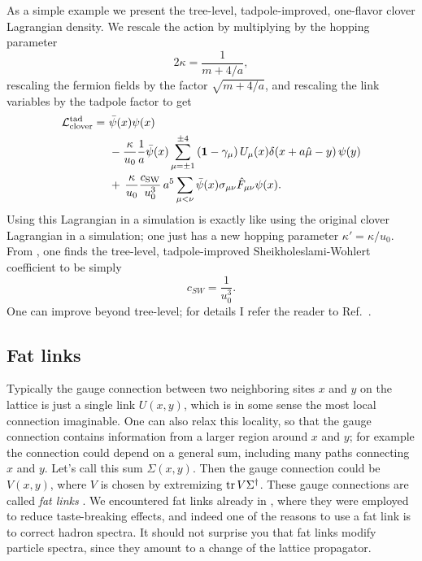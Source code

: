 As a simple example we present the tree-level, tadpole-improved, one-flavor
clover Lagrangian density. We rescale the action by multiplying by 
the hopping parameter
\begin{equation}
  2\kappa=\frac{1}{m+4/a},
\end{equation}
rescaling the fermion fields by the factor $\sqrt{m+4/a}$, and
rescaling the link variables by the tadpole factor to get
\begin{equation}\begin{aligned}
  \mathcal{L}_\text{clover}^\text{tad}=~&\bar{\psi}(x)\psi(x)\\
    &-\frac{\kappa}{u_0}\frac{1}{a}\bar{\psi}(x)
    \sum_{\mu=\pm1}^{\pm4}\left({\mathbf 1}-\gamma_\mu\right)U_\mu(x)
           \delta(x+a\hat{\mu}-y)\,\psi(y)\\
    &+\,\frac{\kappa}{u_0}\frac{c_\text{SW}}{u_0^3}
               \,a^5\sum_{\mu<\nu}\bar{\psi}(x)
                  \sigma_{\mu\nu}\hat{F}_{\mu\nu}\psi(x).
\end{aligned}\end{equation}
Using this Lagrangian in a simulation is exactly like using the original 
clover Lagrangian in a simulation; one just has a new hopping parameter
$\kappa'=\kappa/u_0$. From , one finds the
tree-level, tadpole-improved Sheikholeslami-Wohlert coefficient to be
simply
\begin{equation}
  c_{SW}=\frac{1}{u_0^3}.
\end{equation}
One can improve beyond tree-level; for details I refer the reader
to Ref.~\cite{degrand_lattice_2006}.

\subsection{Fat links}

Typically the gauge connection between two neighboring sites $x$ and $y$
on the lattice is just a single link $U(x,y)$, which is in some sense the 
most local connection imaginable. One can also relax this locality, so that 
the gauge connection contains information from a larger region around 
$x$ and $y$; for example the connection could depend on a general sum, 
including many paths connecting $x$ and $y$. Let's call
this sum $\Sigma(x,y)$. Then the gauge connection could be $V(x,y)$,
where $V$ is chosen by extremizing $\tr V\Sigma^\dagger$. These gauge
connections are called {\it fat links} \cite{blum_improving_1997}. 
We encountered fat links
already in , where they were employed to reduce
taste-breaking effects, and indeed one of the reasons to use a fat link
is to correct hadron spectra. It should not surprise you that fat links
modify particle spectra, since they amount to a change of the lattice 
propagator.

